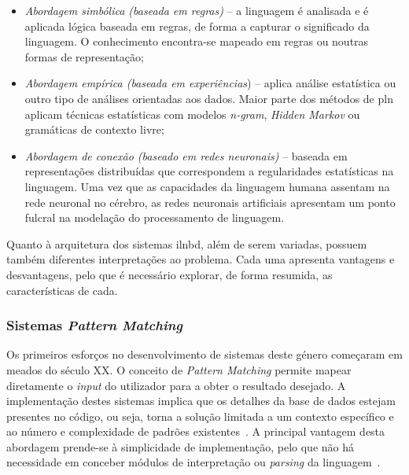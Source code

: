 \begin{itemize}
    \item 
    {
        \textit{Abordagem simbólica (baseada em regras)} -- a linguagem é analisada e é aplicada lógica baseada em regras, de forma a capturar o significado da linguagem. O conhecimento encontra-se mapeado em regras ou noutras formas de representação;
    }
    \item
    {
        \textit{Abordagem empírica (baseada em experiências}) -- aplica análise estatística ou outro tipo de análises orientadas aos dados. Maior parte dos métodos de \gls{pln} aplicam técnicas estatísticas com modelos \textit{n-gram}, \textit{Hidden Markov} ou gramáticas de contexto livre;
    }
    \item
    {
        \textit{Abordagem de conexão (baseado em redes neuronais)} -- baseada em representações distribuídas que correspondem a regularidades estatísticas na linguagem. Uma vez que as capacidades da linguagem humana assentam na rede neuronal no cérebro, as redes neuronais artificiais apresentam um ponto fulcral na modelação do processamento de linguagem.
    }
\end{itemize}

Quanto à arquitetura dos sistemas \gls{ilnbd}, além de serem variadas, possuem também diferentes interpretações ao problema. Cada uma apresenta vantagens e desvantagens, pelo que é necessário explorar, de forma resumida, as características de cada.

\subsubsection*{Sistemas \textit{Pattern Matching}}
Os primeiros esforços no desenvolvimento de sistemas deste género começaram em meados do século XX. O conceito de \textit{Pattern Matching} permite mapear diretamente o \textit{input} do utilizador para a obter o resultado desejado. A implementação destes sistemas implica que os detalhes da base de dados estejam presentes no código, ou seja, torna a solução limitada a um contexto específico e ao número e complexidade de padrões existentes~\parencite{nlidb_brief_review}. A principal vantagem desta abordagem prende-se à simplicidade de implementação, pelo que não há necessidade em conceber módulos de interpretação ou \textit{parsing} da linguagem~\parencite{nlidb_brief_review, survey_nlidb}.

